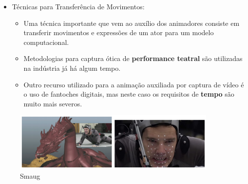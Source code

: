 \documentclass[brazil]{beamer}
\begin{document}
\begin{frame}

\begin{itemize}
      \item Técnicas para Transferência de Movimentos:
      
      \begin{itemize}
      
        \item Uma técnica importante que vem ao auxílio dos animadores consiste em transferir movimentos e expressões de um ator para um modelo computacional.
        
        \item Metodologias para captura ótica de \textbf{performance teatral} são utilizadas na indústria já há algum tempo.
        
        \item Outro recurso utilizado para a animação auxiliada por captura de vídeo é o uso de fantoches digitais, mas neste caso os requisitos de \textbf{tempo} são muito mais severos.
        
      \end{itemize}   
          
  \end{itemize} 
	
\end{frame}

\begin{frame}
  \begin{figure}
        \centering
        \includegraphics[width = 0.9\textwidth, keepaspectratio]{./img/smaug_sherlock.png}
        \caption{Smaug}
      \end{figure}

\end{frame}
\end{document}
